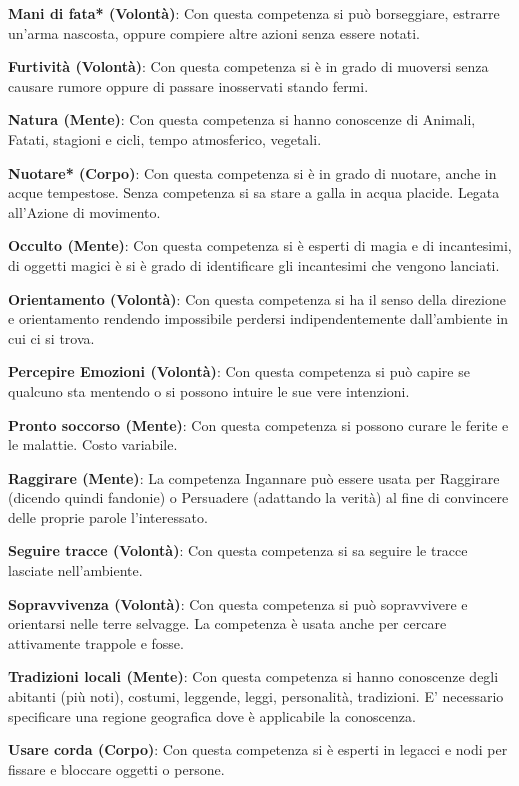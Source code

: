 \documentclass[12pt,a4paper,twoside,openany]{book}
\begin{document}
\begin{multicols}{2}
\textbf{Mani di fata* (Volontà)}: Con questa competenza si può borseggiare, estrarre un'arma nascosta, oppure compiere altre azioni senza essere notati. 

\textbf{Furtività (Volontà)}: Con questa competenza si è in grado di muoversi senza causare rumore oppure di passare inosservati stando fermi. 

\textbf{Natura (Mente)}: Con questa competenza si hanno conoscenze di Animali, Fatati, stagioni e cicli, tempo atmosferico, vegetali. 

\textbf{Nuotare* (Corpo)}: Con questa competenza si è in grado di nuotare, anche in acque tempestose. Senza competenza si sa stare a galla in acqua placide. Legata all'Azione di movimento.

\textbf{Occulto (Mente)}: Con questa competenza si è esperti di magia e di incantesimi, di oggetti magici è si è grado di identificare gli incantesimi che vengono lanciati. 

\textbf{Orientamento (Volontà)}: Con questa competenza si ha il senso della direzione e orientamento rendendo impossibile perdersi indipendentemente dall'ambiente in cui ci si trova. 

\textbf{Percepire Emozioni (Volontà)}: Con questa competenza si può capire se qualcuno sta mentendo o si possono intuire le sue vere intenzioni.

\textbf{Pronto soccorso (Mente)}: Con questa competenza si possono curare le ferite e le malattie. Costo variabile.

\textbf{Raggirare (Mente)}: La competenza Ingannare può essere usata per Raggirare (dicendo quindi fandonie) o Persuadere (adattando la verità) al fine di convincere delle proprie parole l'interessato.

\textbf{Seguire tracce (Volontà)}: Con questa competenza si sa seguire le tracce lasciate nell'ambiente. 

\textbf{Sopravvivenza (Volontà)}: Con questa competenza si può sopravvivere e orientarsi nelle terre selvagge. La competenza è usata anche per cercare attivamente trappole e fosse.

\textbf{Tradizioni locali (Mente)}: Con questa competenza si hanno conoscenze degli abitanti (più noti), costumi, leggende, leggi, personalità, tradizioni. E' necessario specificare una regione geografica dove è applicabile la conoscenza. 

\textbf{Usare corda (Corpo)}: Con questa competenza si è esperti in legacci e nodi per fissare e bloccare oggetti o persone. 


\end{multicols}
\end{document}
